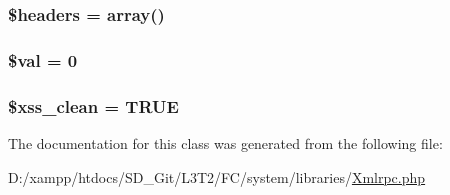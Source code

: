 \subsubsection[{\$headers}]{\setlength{\rightskip}{0pt plus 5cm}\$headers = array()}\label{class_x_m_l___r_p_c___response_a52500036ee807241b8b4b7e2367c49ef}
\hypertarget{class_x_m_l___r_p_c___response_aac81a74a7b30767af29bfd9a695636df}{}
\subsubsection[{\$val}]{\setlength{\rightskip}{0pt plus 5cm}\$val = 0}\label{class_x_m_l___r_p_c___response_aac81a74a7b30767af29bfd9a695636df}
\hypertarget{class_x_m_l___r_p_c___response_a0f2ee8861c0b3164a5c6e126dd98c0cc}{}
\subsubsection[{\$xss\+\_\+clean}]{\setlength{\rightskip}{0pt plus 5cm}\$xss\+\_\+clean = T\+R\+U\+E}\label{class_x_m_l___r_p_c___response_a0f2ee8861c0b3164a5c6e126dd98c0cc}


The documentation for this class was generated from the following file\+:\begin{DoxyCompactItemize}
\item 
D\+:/xampp/htdocs/\+S\+D\+\_\+\+Git/\+L3\+T2/\+F\+C/system/libraries/\hyperlink{_xmlrpc_8php}{Xmlrpc.\+php}\end{DoxyCompactItemize}
